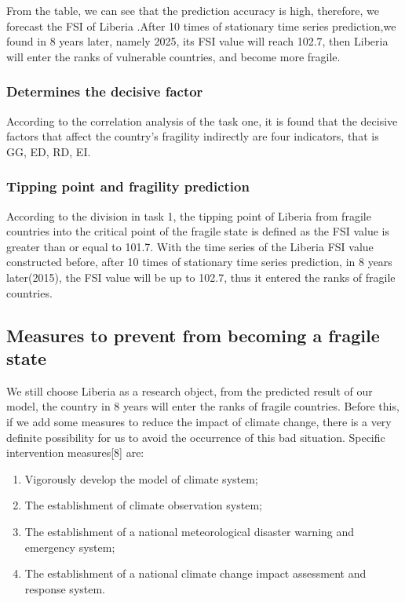 \documentclass{mcmthesis}
\begin{document}
From the table, we can see that the prediction accuracy is high, therefore, we forecast the FSI of Liberia .After 10 times of stationary time series prediction,we found in 8 years later, namely 2025, its FSI value will reach 102.7, then Liberia will enter the ranks of vulnerable countries, and become more fragile.

\subsubsection{Determines the decisive factor}
According to the correlation analysis of the task one, it is found that the decisive factors that affect the country's fragility indirectly are four indicators, that is GG, ED, RD, EI.
\subsubsection{Tipping point and fragility prediction}
According to the division in task 1, the tipping point of Liberia from fragile countries into the critical point of the fragile state is defined as the FSI value is greater than or equal to 101.7. With the time series of the Liberia FSI value constructed before,  after 10 times of stationary time series prediction, in 8 years later(2015),  the FSI value will be up to 102.7, thus it entered the ranks of fragile countries.

\subsection{Measures to prevent from becoming a fragile state}
We still choose Liberia as a research object, from the predicted result of our  model, the country in 8 years will enter the ranks of fragile countries. Before this, if we add some measures to reduce the impact of climate change, there is a very definite possibility for us to avoid the occurrence of this bad situation. Specific intervention measures[8] are:
\begin{enumerate}
\item Vigorously develop the model of climate system;
\item The establishment of climate observation system;
\item The establishment of a national meteorological disaster warning and emergency system;
\item The establishment of a national climate change impact assessment and response system.
\end{enumerate}
\end{document}
